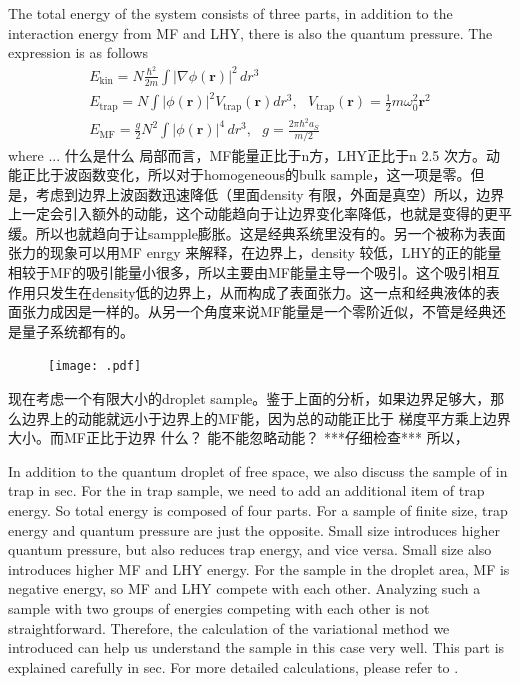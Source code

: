 The total energy of the system consists of three parts, in addition to the interaction energy from MF and LHY, there is also the quantum pressure. The expression is as follows
\begin{equation}
\begin{split}
E_{\text{kin}}=N \frac{\hbar ^2}{2m}\int \left| \nabla \phi (\pmb{r})\right| ^2 \, dr^3\\
E_{\text{trap}}=N\int \left| \phi (\pmb{r})\right| ^2V_{\text{trap}}(\pmb{r})dr^3,\text{   }V_{\text{trap}}(\pmb{r})=\frac{1}{2}m \omega _0^2\pmb{r}^2\\
E_{\text{MF}}=\frac{g}{2}N^2\int \left| \phi (\pmb{r})\right| ^4 \, dr^3,\text{    }g=\frac{2\pi  \hbar ^2a_S}{m/2}
\end{split}
\end{equation}
where ... 什么是什么
局部而言，MF能量正比于n方，LHY正比于n 2.5 次方。动能正比于波函数变化，所以对于homogeneous的bulk sample，这一项是零。但是，考虑到边界上波函数迅速降低（里面density 有限，外面是真空）所以，边界上一定会引入额外的动能，这个动能趋向于让边界变化率降低，也就是变得的更平缓。所以也就趋向于让sampple膨胀。这是经典系统里没有的。另一个被称为表面张力的现象可以用MF enrgy 来解释，在边界上，density 较低，LHY的正的能量相较于MF的吸引能量小很多，所以主要由MF能量主导一个吸引。这个吸引相互作用只发生在density低的边界上，从而构成了表面张力。这一点和经典液体的表面张力成因是一样的。从另一个角度来说MF能量是一个零阶近似，不管是经典还是量子系统都有的。

\begin{figure}[htb]
\begin{center}
\texttt{[image: .pdf]}
\end{center}
\caption[]{}
\label{}
\end{figure}


现在考虑一个有限大小的droplet sample。鉴于上面的分析，如果边界足够大，那么边界上的动能就远小于边界上的MF能，因为总的动能正比于 梯度平方乘上边界大小。而MF正比于边界 什么？ 能不能忽略动能？ ***仔细检查*** 所以，

In addition to the quantum droplet of free space, we also discuss the sample of in trap in sec. For the in trap sample, we need to add an additional item of trap energy. So total energy is composed of four parts. For a sample of finite size, trap energy and quantum pressure are just the opposite. Small size introduces higher quantum pressure, but also reduces trap energy, and vice versa. Small size also introduces higher MF and LHY energy. For the sample in the droplet area, MF is negative energy, so MF and LHY compete with each other. Analyzing such a sample with two groups of energies competing with each other is not straightforward. Therefore, the calculation of the variational method we introduced can help us understand the sample in this case very well. This part is explained carefully in sec. For more detailed calculations, please refer to \cite{Liuxiaji2020}.

